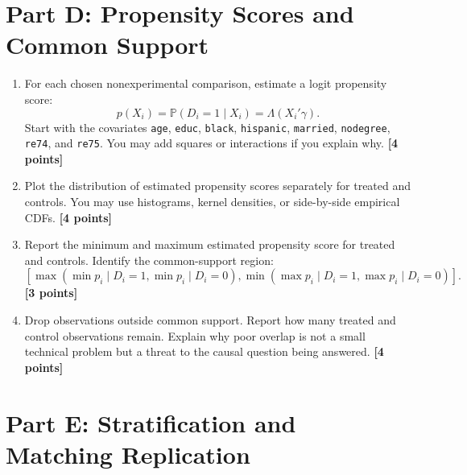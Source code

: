 \documentclass[11pt]{article}
\newcommand{\Prob}{\mathbb{P}}
\newcommand{\points}[1]{\hfill \textbf{[#1 points]}}
\begin{document}
\section*{Part D: Propensity Scores and Common Support}

\begin{enumerate}[label=D\arabic*.]
  \item For each chosen nonexperimental comparison, estimate a logit propensity score:
  \[
    p(X_i)=\Prob(D_i=1\mid X_i)
    =
    \Lambda(X_i'\gamma).
  \]
  Start with the covariates \texttt{age}, \texttt{educ}, \texttt{black}, \texttt{hispanic}, \texttt{married}, \texttt{nodegree}, \texttt{re74}, and \texttt{re75}. You may add squares or interactions if you explain why. \points{4}

  \item Plot the distribution of estimated propensity scores separately for treated and controls. You may use histograms, kernel densities, or side-by-side empirical CDFs. \points{4}

  \item Report the minimum and maximum estimated propensity score for treated and controls. Identify the common-support region:
  \[
    [\max(\min p_i \mid D_i=1,\min p_i \mid D_i=0),
      \min(\max p_i \mid D_i=1,\max p_i \mid D_i=0)].
  \]
  \points{3}

  \item Drop observations outside common support. Report how many treated and control observations remain. Explain why poor overlap is not a small technical problem but a threat to the causal question being answered. \points{4}
\end{enumerate}

\section*{Part E: Stratification and Matching Replication}
\end{document}
